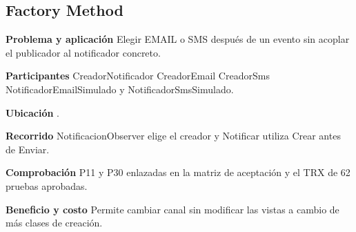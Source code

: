 \noindent\begin{minipage}{\linewidth}
\subsection{Factory Method}
\textbf{Problema y aplicación} Elegir EMAIL o SMS después de un evento sin acoplar el publicador al notificador concreto.

\textbf{Participantes} CreadorNotificador CreadorEmail CreadorSms NotificadorEmailSimulado y NotificadorSmsSimulado.

\textbf{Ubicación} \href{https://github.com/Alan77-bot/LogiMarket360Alan/blob/68bda51063441415524ede51bdf61649ee9b4973/LogiMarket.Infrastructure/Notificaciones/CreadorNotificador.cs#L4}{}.

\textbf{Recorrido} NotificacionObserver elige el creador y Notificar utiliza Crear antes de Enviar.


\textbf{Comprobación} P11 y P30 enlazadas en la matriz de aceptación y el TRX de 62 pruebas aprobadas.

\textbf{Beneficio y costo} Permite cambiar canal sin modificar las vistas a cambio de más clases de creación.

\end{minipage}\par\smallskip
